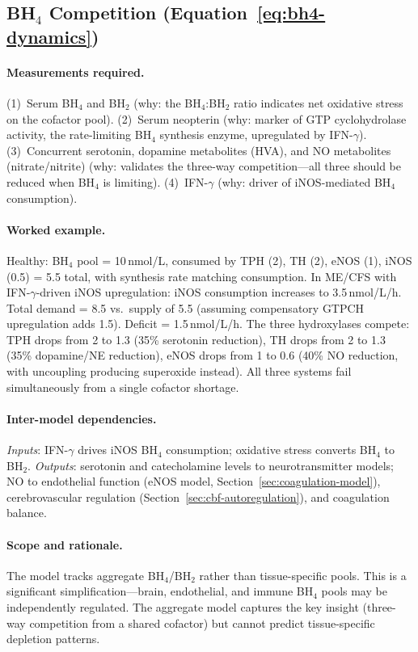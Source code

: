 \subsection{BH$_4$ Competition (Equation~\ref{eq:bh4-dynamics})}

\paragraph{Measurements required.}
(1)~Serum BH$_4$ and BH$_2$ (why: the BH$_4$:BH$_2$ ratio indicates net oxidative stress on the cofactor pool).
(2)~Serum neopterin (why: marker of GTP cyclohydrolase activity, the rate-limiting BH$_4$ synthesis enzyme, upregulated by IFN-$\gamma$).
(3)~Concurrent serotonin, dopamine metabolites (HVA), and NO metabolites (nitrate/nitrite) (why: validates the three-way competition---all three should be reduced when BH$_4$ is limiting).
(4)~IFN-$\gamma$ (why: driver of iNOS-mediated BH$_4$ consumption).

\paragraph{Worked example.}
Healthy: BH$_4$ pool = 10\,nmol/L, consumed by TPH (2), TH (2), eNOS (1), iNOS (0.5) = 5.5 total, with synthesis rate matching consumption. In ME/CFS with IFN-$\gamma$-driven iNOS upregulation: iNOS consumption increases to 3.5\,nmol/L/h. Total demand = 8.5 vs.\ supply of 5.5 (assuming compensatory GTPCH upregulation adds 1.5). Deficit = 1.5\,nmol/L/h. The three hydroxylases compete: TPH drops from 2 to 1.3 (35\% serotonin reduction), TH drops from 2 to 1.3 (35\% dopamine/NE reduction), eNOS drops from 1 to 0.6 (40\% NO reduction, with uncoupling producing superoxide instead). All three systems fail simultaneously from a single cofactor shortage.

\paragraph{Inter-model dependencies.}
\emph{Inputs}: IFN-$\gamma$ drives iNOS BH$_4$ consumption; oxidative stress converts BH$_4$ to BH$_2$. \emph{Outputs}: serotonin and catecholamine levels to neurotransmitter models; NO to endothelial function (eNOS model, Section~\ref{sec:coagulation-model}), cerebrovascular regulation (Section~\ref{sec:cbf-autoregulation}), and coagulation balance.

\paragraph{Scope and rationale.}
The model tracks aggregate BH$_4$/BH$_2$ rather than tissue-specific pools. This is a significant simplification---brain, endothelial, and immune BH$_4$ pools may be independently regulated. The aggregate model captures the key insight (three-way competition from a shared cofactor) but cannot predict tissue-specific depletion patterns.

